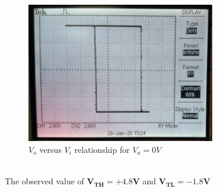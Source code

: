 \documentclass[12pt]{article}
\begin{document}
        \begin{figure}[H]
            \centering
            \includegraphics[width = 0.6\linewidth, height = 2.4in]{reports/lab2/scmidtt2.jpeg}
            \caption{$V_o$ versus $V_i$ relationship for $V_a = 0V$}
        \end{figure}
        \\
        The observed value of $\mathbf{V_{TH} = +4.8V}$ and $\mathbf{V_{TL} = -1.8V}$\\
\end{document}
